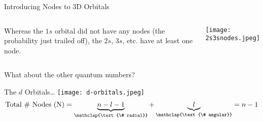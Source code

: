 \documentclass[notes=hide]{beamer}
\begin{document}
\begin{frame}{Introducing Nodes to 3D Orbitals}
	\begin{columns}
		Whereas the $1s$ orbital did not have any nodes (the probability
		just trailed off), the $2s$, $3s$, etc. have \alert{at least} one
		node.


		\centering
		\texttt{[image: 2s3snodes.jpeg]}
	\end{columns}
\end{frame}

\begin{frame}{What about the other quantum numbers?}
	\begin{center}
	\end{center}
\end{frame}

\begin{frame}{The $d$ Orbitals\ldots}
	\centering
	\texttt{[image: d-orbitals.jpeg]}
	\begin{equation*}
		\text{Total \# Nodes (N)} = \underbrace{n - l -
		1}_{\mathclap{\text{\# radial}}} +
		\underbrace{l}_{\mathclap{\text{\# angular}}} = n - 1
	\end{equation*}
\end{frame}
\end{document}
